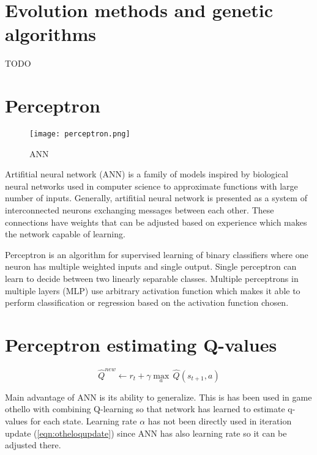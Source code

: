 \section{Evolution methods and genetic algorithms}
TODO

\section{Perceptron}
\begin{wrapfigure}{r}{0.4\textwidth}
  \vspace*{-1.85cm}
  \centering
  \texttt{[image: perceptron.png]}
  \vspace*{-0.85cm}
  \caption{ANN}
  \label{fig:network}
  \vspace*{-0.60cm}
\end{wrapfigure}

Artifitial neural network (ANN) is a family of models inspired by biological
neural networks used in computer science to approximate functions with
large number of inputs. Generally, artifitial neural network is presented
as a system of interconnected neurons exchanging messages between each
other. These connections have weights that can be adjusted based on
experience which makes the network capable of learning.

Perceptron is an algorithm for supervised learning of binary classifiers
where one neuron has multiple weighted inputs and single output. Single
perceptron can learn to decide between two linearly separable
classes. Multiple perceptrons in multiple layers (MLP) use arbitrary
activation function which makes it able to perform classification or
regression based on the activation function chosen.

\section{Perceptron estimating Q-values}
\begin{wrapfigure}{r}{0.42\textwidth}
  \vspace*{-1.15cm}
  \begin{equation}
    \label{eqn:otheloqupdate}
    \hat{Q}^{new}\!\leftarrow\!r_t\!+\!{\gamma}{\max_a}\,\hat{Q}(s_{t+1},\!a)
  \end{equation}
  \vspace*{-0.95cm}
\end{wrapfigure}

Main advantage of ANN is its ability to generalize. This is has been used
in game othello \cite{othello} with combining Q-learning so that network
has learned to estimate q-values for each state. Learning rate $\alpha$ has
not been directly used in iteration update (\ref{eqn:otheloqupdate}) since
ANN has also learning rate so it can be adjusted there.

